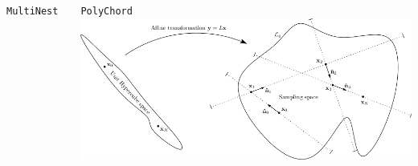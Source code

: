 \documentclass[aspectratio=169]{beamer}
\begin{document}
\begin{frame}
\begin{columns}
\begin{block}{\texttt{MultiNest}~}
        \end{block}%
        \vspace{-5pt}
        \begin{block}{\texttt{PolyChord}~}
            \includegraphics[width=\textwidth]{figures/polychord.png}
        \end{block}



    \end{columns}
\end{frame}
\end{document}
